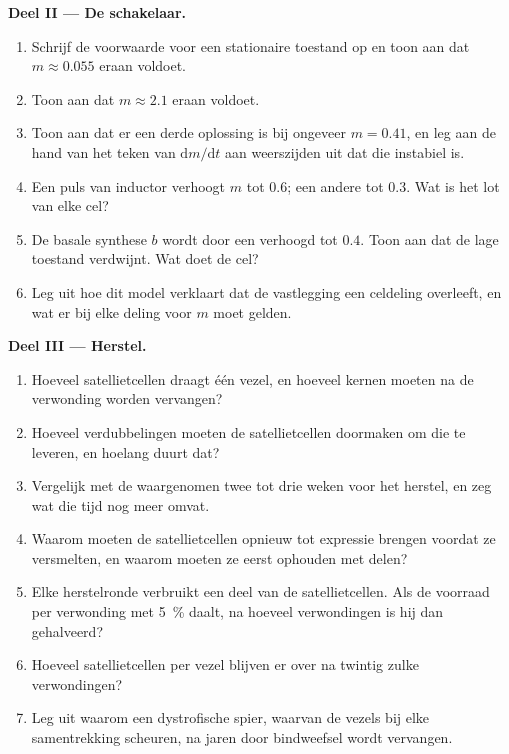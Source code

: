 \begin{problem}
\medskip
\noindent\textbf{Deel II --- De schakelaar.}
\begin{enumerate}[resume]
  \item Schrijf de voorwaarde voor een stationaire toestand op en toon aan
        dat $m \approx
        0.055$ eraan voldoet.
  \item Toon aan dat $m \approx 2.1$ eraan voldoet.
  \item Toon aan dat er een derde oplossing is bij ongeveer $m = 0.41$, en
        leg aan de hand van het teken van $\mathrm{d}m/\mathrm{d}t$ aan
        weerszijden uit dat die instabiel is.
  \item Een puls van inductor verhoogt $m$ tot $0.6$; een andere tot $0.3$.
        Wat is het lot van elke cel?
  \item De basale synthese $b$ wordt door een  verhoogd tot $0.4$.
        Toon aan dat de lage toestand verdwijnt. Wat doet de cel?
  \item Leg uit hoe dit model verklaart dat de vastlegging een celdeling
        overleeft, en wat er bij elke deling voor $m$ moet gelden.
\end{enumerate}

\medskip
\noindent\textbf{Deel III --- Herstel.}
\begin{enumerate}[resume]
  \item Hoeveel satellietcellen draagt één vezel, en hoeveel kernen moeten
        na de verwonding worden vervangen?
  \item Hoeveel verdubbelingen moeten de satellietcellen doormaken om die
        te leveren, en hoelang duurt dat?
  \item Vergelijk met de waargenomen twee tot drie weken voor het herstel,
        en zeg wat die tijd nog meer omvat.
  \item Waarom moeten de satellietcellen  opnieuw tot expressie brengen
        voordat ze versmelten, en waarom moeten ze eerst ophouden met delen?
  \item Elke herstelronde verbruikt een deel van de satellietcellen. Als de
        voorraad per verwonding met \qty{5}{\%} daalt, na hoeveel
        verwondingen is hij dan gehalveerd?
  \item Hoeveel satellietcellen per vezel blijven er over na twintig zulke
        verwondingen?
  \item Leg uit waarom een dystrofische spier, waarvan de vezels bij elke
        samentrekking scheuren, na jaren door bindweefsel wordt vervangen.
\end{enumerate}


\end{problem}
